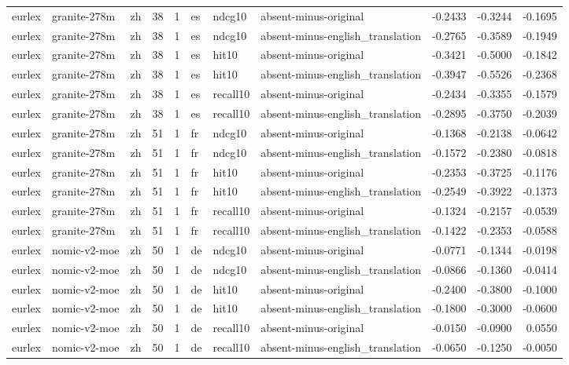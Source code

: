 \begin{tabular}{lllrrlllrrr}
eurlex & granite-278m & zh & 38 & 1 & es & ndcg10 & absent-minus-original & -0.2433 & -0.3244 & -0.1695 \\
eurlex & granite-278m & zh & 38 & 1 & es & ndcg10 & absent-minus-english\_translation & -0.2765 & -0.3589 & -0.1949 \\
eurlex & granite-278m & zh & 38 & 1 & es & hit10 & absent-minus-original & -0.3421 & -0.5000 & -0.1842 \\
eurlex & granite-278m & zh & 38 & 1 & es & hit10 & absent-minus-english\_translation & -0.3947 & -0.5526 & -0.2368 \\
eurlex & granite-278m & zh & 38 & 1 & es & recall10 & absent-minus-original & -0.2434 & -0.3355 & -0.1579 \\
eurlex & granite-278m & zh & 38 & 1 & es & recall10 & absent-minus-english\_translation & -0.2895 & -0.3750 & -0.2039 \\
eurlex & granite-278m & zh & 51 & 1 & fr & ndcg10 & absent-minus-original & -0.1368 & -0.2138 & -0.0642 \\
eurlex & granite-278m & zh & 51 & 1 & fr & ndcg10 & absent-minus-english\_translation & -0.1572 & -0.2380 & -0.0818 \\
eurlex & granite-278m & zh & 51 & 1 & fr & hit10 & absent-minus-original & -0.2353 & -0.3725 & -0.1176 \\
eurlex & granite-278m & zh & 51 & 1 & fr & hit10 & absent-minus-english\_translation & -0.2549 & -0.3922 & -0.1373 \\
eurlex & granite-278m & zh & 51 & 1 & fr & recall10 & absent-minus-original & -0.1324 & -0.2157 & -0.0539 \\
eurlex & granite-278m & zh & 51 & 1 & fr & recall10 & absent-minus-english\_translation & -0.1422 & -0.2353 & -0.0588 \\
eurlex & nomic-v2-moe & zh & 50 & 1 & de & ndcg10 & absent-minus-original & -0.0771 & -0.1344 & -0.0198 \\
eurlex & nomic-v2-moe & zh & 50 & 1 & de & ndcg10 & absent-minus-english\_translation & -0.0866 & -0.1360 & -0.0414 \\
eurlex & nomic-v2-moe & zh & 50 & 1 & de & hit10 & absent-minus-original & -0.2400 & -0.3800 & -0.1000 \\
eurlex & nomic-v2-moe & zh & 50 & 1 & de & hit10 & absent-minus-english\_translation & -0.1800 & -0.3000 & -0.0600 \\
eurlex & nomic-v2-moe & zh & 50 & 1 & de & recall10 & absent-minus-original & -0.0150 & -0.0900 & 0.0550 \\
eurlex & nomic-v2-moe & zh & 50 & 1 & de & recall10 & absent-minus-english\_translation & -0.0650 & -0.1250 & -0.0050 \\

\end{tabular}
